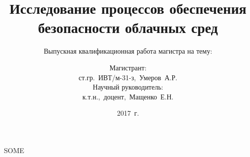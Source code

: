 \documentclass[xetex,mathserif,serif,t]{beamer}
\title{Исследование процессов обеспечения безопасности облачных сред}
\subtitle{Выпускная квалификационная работа магистра на тему:}
\author{Магистрант:\\
ст.гр.~ИВТ/м-31-з,~Умеров~А.Р. \\
\vspace{0.7\baselineskip}
Научный руководитель:\\
к.т.н.,~доцент,~Мащенко~Е.Н.}
\institute{Севастопольский государственный университет \\
Кафедра информационных технологий и компьютерных систем}
\date{2017~г.}
\begin{document}
SOME
% 
\end{document}
